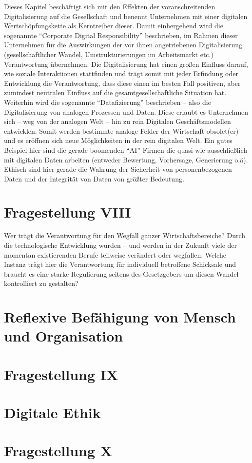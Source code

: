 \documentclass[journal]{IEEEtran}
\begin{document}
\begin{onecolumn}
Dieses Kapitel beschäftigt sich mit den Effekten der voranschreitenden Digitalisierung auf die Gesellschaft und
benennt Unternehmen mit einer digitalen Wertschöpfungskette als Kerntreiber dieser. Damit einhergehend wird
die sogenannte ``Corporate Digital Responsibility'' beschrieben, im Rahmen dieser Unternehmen für die Auswirkungen
der vor ihnen angetriebenen Digitalisierung (gesellschaftlicher Wandel, Umstrukturierungen im Arbeitsmarkt etc.)
Verantwortung übernehmen. Die Digitalisierung hat einen großen Einfluss darauf, wie soziale Interaktionen stattfinden
und trägt somit mit jeder Erfindung oder Entwicklung die Verantwortung, dass diese einen im besten Fall
positiven, aber zumindest neutralen Einfluss auf die gesamtgesellschaftliche Situation hat. Weiterhin wird die
sogenannte ``Datafizierung'' beschrieben – also die Digitalisierung von analogen Prozessen und Daten. Diese
erlaubt es Unternehmen sich – weg von der analogen Welt – hin zu rein Digitalen Geschäftsmodellen entwicklen.
Somit werden bestimmte analoge Felder der Wirtschaft obsolet(er) und es eröffnen sich neue Möglichkeiten in der
rein digitalen Welt. Ein gutes Beispiel hier sind die gerade boomenden ``AI''-Firmen die quasi wie ausschließlich
mit digitalen Daten arbeiten (entweder Bewertung, Vorhersage, Generierung o.ä). Ethisch sind hier gerade die Wahrung
der Sicherheit von personenbezogenen Daten und der Integrität von Daten von größter Bedeutung. 

\section*{Fragestellung VIII}

Wer trägt die Verantwortung für den Wegfall ganzer Wirtschaftsbereiche? Durch die technologische Entwicklung wurden
– und werden in der Zukunft viele der momentan existierenden Berufe teilweise verändert oder wegfallen. Welche Instanz
trägt hier die Verantwortung für individuell betroffene Schicksale und braucht es eine starke Regulierung seitens des
Gesetzgebers um diesen Wandel kontrolliert zu gestalten? 

\newpage

\section{Reflexive Befähigung von Mensch und Organisation}

\section*{Fragestellung IX}

\section{Digitale Ethik}

\section*{Fragestellung X}

\end{onecolumn}
\end{document}
